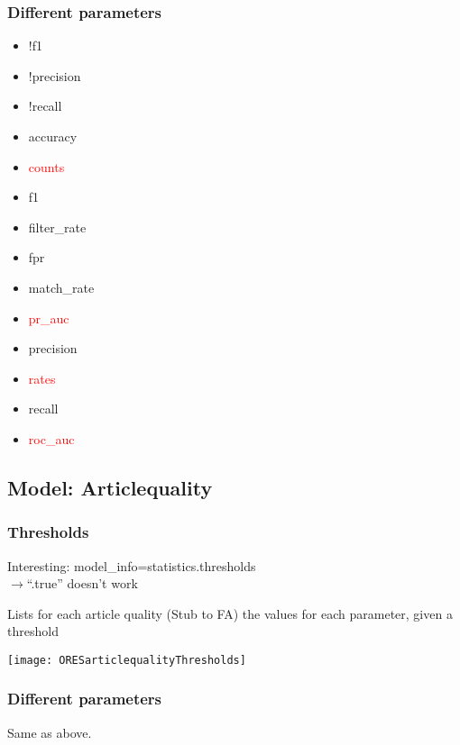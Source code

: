 \documentclass[12pt,a4paper]{article}
\begin{document}
\subsubsection{Different parameters}
\begin{itemize}
\item !f1
\item !precision
\item !recall
\item accuracy
\item \textcolor{red}{counts}
\item f1
\item filter\_rate
\item fpr
\item match\_rate
\item \textcolor{red}{pr\_auc}
\item precision
\item \textcolor{red}{rates}
\item recall
\item \textcolor{red}{roc\_auc}
\end{itemize}
\subsection{Model: Articlequality}
\subsubsection{Thresholds}
Interesting: model\_info=statistics.thresholds\\
$\rightarrow$``.true'' doesn't work
\begin{description}
\item Lists for each article quality (Stub to FA) the values for each parameter, given a threshold
\item \texttt{[image: ORESarticlequalityThresholds]}
\end{description}
\subsubsection{Different parameters}
Same as above.
\end{document}
